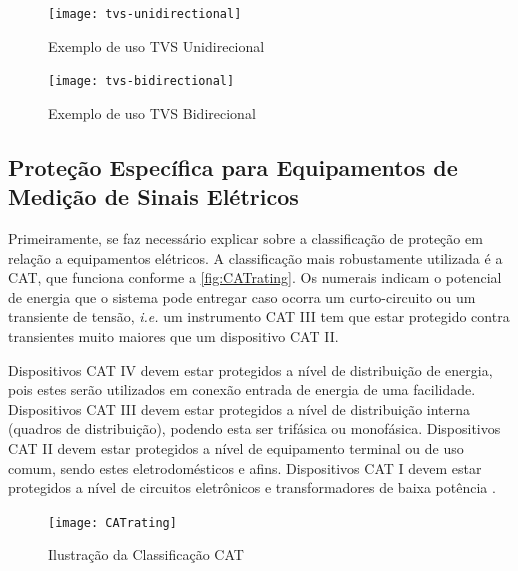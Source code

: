 \begin{figure}[htb!]%
    \caption{Exemplo de uso TVS Unidirecional}%
    \label{fig:tvsUnidirecional}%
    \texttt{[image: tvs-unidirectional]}%
\end{figure}

\begin{figure}[htb!]%
    \caption{Exemplo de uso TVS Bidirecional}%
    \label{fig:tvsBidirecional}%
    \texttt{[image: tvs-bidirectional]}%
\end{figure}

\subsection{Proteção Específica para Equipamentos de Medição de Sinais Elétricos}\label{subsec:especProtec}

Primeiramente, se faz necessário explicar sobre a classificação de proteção em relação a equipamentos elétricos. A classificação mais robustamente utilizada é a CAT, que funciona conforme a \autoref{fig:CATrating}. Os numerais indicam o potencial de energia que o sistema pode entregar caso ocorra um curto-circuito ou um transiente de tensão, \textit{i.e.} um instrumento CAT III tem que estar protegido contra transientes muito maiores que um dispositivo CAT II.

Dispositivos CAT IV devem estar protegidos a nível de distribuição de energia, pois estes serão utilizados em conexão entrada de energia de uma facilidade. Dispositivos CAT III devem estar protegidos a nível de distribuição interna (quadros de distribuição), podendo esta ser trifásica ou monofásica. Dispositivos CAT II devem estar protegidos a nível de equipamento terminal ou de uso comum, sendo estes eletrodomésticos e afins. Dispositivos CAT I devem estar protegidos a nível de circuitos eletrônicos e transformadores de baixa potência \cite{CATratingu}. %

\begin{figure}[htb!]%
    \caption{Ilustração da Classificação CAT}%
    \label{fig:CATrating}%
    \texttt{[image: CATrating]}%
\end{figure}



